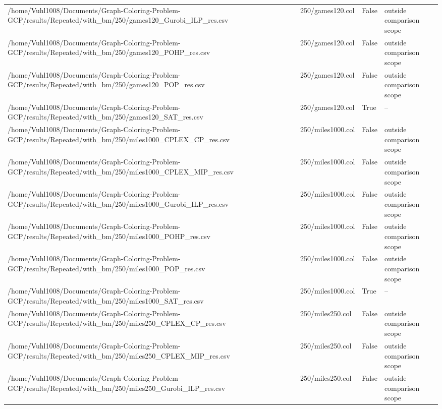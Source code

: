\begin{table}[htbp]
\begin{tabular}{llll}
/home/Vuhl1008/Documents/Graph-Coloring-Problem-GCP/results/Repeated/with\_bm/250/games120\_Gurobi\_ILP\_res.csv & 250/games120.col & False & outside comparison scope \\
/home/Vuhl1008/Documents/Graph-Coloring-Problem-GCP/results/Repeated/with\_bm/250/games120\_POHP\_res.csv & 250/games120.col & False & outside comparison scope \\
/home/Vuhl1008/Documents/Graph-Coloring-Problem-GCP/results/Repeated/with\_bm/250/games120\_POP\_res.csv & 250/games120.col & False & outside comparison scope \\
/home/Vuhl1008/Documents/Graph-Coloring-Problem-GCP/results/Repeated/with\_bm/250/games120\_SAT\_res.csv & 250/games120.col & True & -- \\
/home/Vuhl1008/Documents/Graph-Coloring-Problem-GCP/results/Repeated/with\_bm/250/miles1000\_CPLEX\_CP\_res.csv & 250/miles1000.col & False & outside comparison scope \\
/home/Vuhl1008/Documents/Graph-Coloring-Problem-GCP/results/Repeated/with\_bm/250/miles1000\_CPLEX\_MIP\_res.csv & 250/miles1000.col & False & outside comparison scope \\
/home/Vuhl1008/Documents/Graph-Coloring-Problem-GCP/results/Repeated/with\_bm/250/miles1000\_Gurobi\_ILP\_res.csv & 250/miles1000.col & False & outside comparison scope \\
/home/Vuhl1008/Documents/Graph-Coloring-Problem-GCP/results/Repeated/with\_bm/250/miles1000\_POHP\_res.csv & 250/miles1000.col & False & outside comparison scope \\
/home/Vuhl1008/Documents/Graph-Coloring-Problem-GCP/results/Repeated/with\_bm/250/miles1000\_POP\_res.csv & 250/miles1000.col & False & outside comparison scope \\
/home/Vuhl1008/Documents/Graph-Coloring-Problem-GCP/results/Repeated/with\_bm/250/miles1000\_SAT\_res.csv & 250/miles1000.col & True & -- \\
/home/Vuhl1008/Documents/Graph-Coloring-Problem-GCP/results/Repeated/with\_bm/250/miles250\_CPLEX\_CP\_res.csv & 250/miles250.col & False & outside comparison scope \\
/home/Vuhl1008/Documents/Graph-Coloring-Problem-GCP/results/Repeated/with\_bm/250/miles250\_CPLEX\_MIP\_res.csv & 250/miles250.col & False & outside comparison scope \\
/home/Vuhl1008/Documents/Graph-Coloring-Problem-GCP/results/Repeated/with\_bm/250/miles250\_Gurobi\_ILP\_res.csv & 250/miles250.col & False & outside comparison scope \\

\end{tabular}
\end{table}
